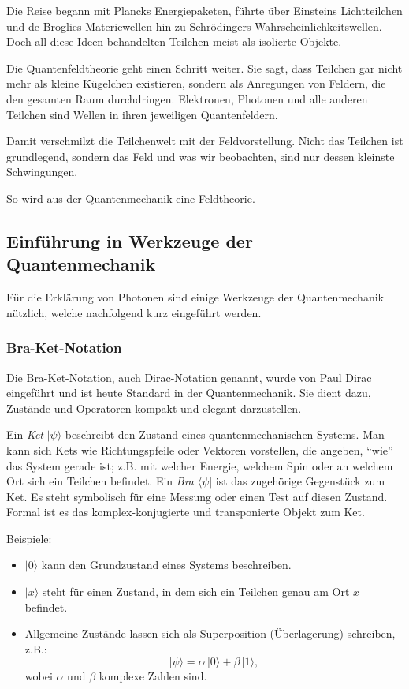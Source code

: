 	Die Reise begann mit Plancks Energiepaketen, führte über Einsteins Lichtteilchen und de Broglies Materiewellen hin zu Schrödingers Wahrscheinlichkeitswellen. 
	Doch all diese Ideen behandelten Teilchen meist als isolierte Objekte.
	
	Die Quantenfeldtheorie geht einen Schritt weiter.
	Sie sagt, dass Teilchen gar nicht mehr als kleine Kügelchen existieren, sondern als Anregungen von Feldern, die den gesamten Raum durchdringen. 
	Elektronen, Photonen und alle anderen Teilchen sind Wellen in ihren jeweiligen Quantenfeldern.
	
	Damit verschmilzt die Teilchenwelt mit der Feldvorstellung.
	Nicht das Teilchen ist grundlegend, sondern das Feld und was wir beobachten, sind nur dessen kleinste Schwingungen.
	
	So wird aus der Quantenmechanik eine Feldtheorie.

\subsection{Einführung in Werkzeuge der Quantenmechanik\label{fourier:subsection:werkzeugeQuantenmechanik}}
	Für die Erklärung von Photonen sind einige Werkzeuge der Quantenmechanik nützlich, welche nachfolgend kurz eingeführt werden.

\subsubsection{Bra-Ket-Notation\label{fourier:subsubsection:braKetNotation}} %
	Die Bra-Ket-Notation, auch Dirac-Notation genannt, wurde von Paul Dirac eingeführt und ist heute Standard in der Quantenmechanik.
	Sie dient dazu, Zustände und Operatoren kompakt und elegant darzustellen.

	Ein \emph{Ket} $|\psi\rangle$ beschreibt den Zustand eines quantenmechanischen Systems.
	Man kann sich Kets wie Richtungspfeile oder Vektoren vorstellen, die angeben, ``wie'' das System gerade ist;
	z.B. mit welcher Energie, welchem Spin oder an welchem Ort sich ein Teilchen befindet.
	Ein \emph{Bra} $\langle\psi|$ ist das zugehörige Gegenstück zum Ket.
	Es steht symbolisch für eine Messung oder einen Test auf diesen Zustand.
	Formal ist es das komplex-konjugierte und transponierte Objekt zum Ket.

	Beispiele:
	\begin{itemize}
	\item $|0\rangle$ kann den Grundzustand eines Systems beschreiben.
	\item $|x\rangle$ steht für einen Zustand, in dem sich ein Teilchen genau am Ort $x$ befindet.
	\item Allgemeine Zustände lassen sich als Superposition (Überlagerung) schreiben, z.B.:
	\[
		|\psi\rangle = \alpha\,|0\rangle + \beta\,|1\rangle,
	\]
	wobei $\alpha$ und $\beta$ komplexe Zahlen sind.
	\end{itemize}

